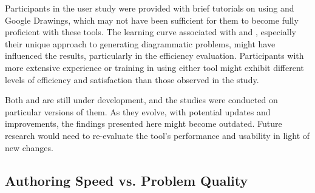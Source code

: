 Participants in the user study were provided with brief tutorials on using \Edgeworth and Google Drawings, which may not have been sufficient for them to become fully proficient with these tools. The learning curve associated with \Penrose and \Edgeworth, especially their unique approach to generating diagrammatic problems, might have influenced the results, particularly in the efficiency evaluation. Participants with more extensive experience or training in using either tool might exhibit different levels of efficiency and satisfaction than those observed in the study.



Both \Penrose and \Edgeworth are still under development, and the studies were conducted on particular versions of them. As they evolve, with potential updates and improvements, the findings presented here might become outdated. Future research would need to re-evaluate the tool's performance and usability in light of new changes. 

\subsection{Authoring Speed vs. Problem Quality}

